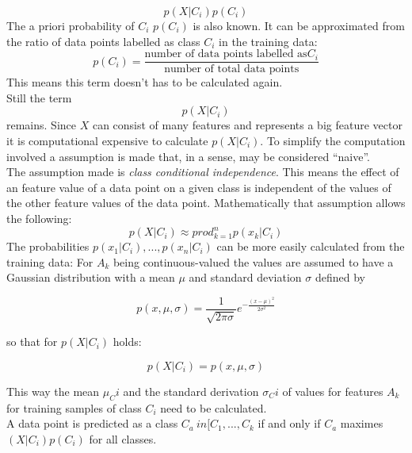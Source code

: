 \begin{equation} \label{eq:nb3}
p(X|C_i) p(C_i)
\end{equation}
The a priori probability of $C_i$  $p(C_i)$ is also known. It can be approximated from the ratio of data points labelled as class $C_i$ in the training data:
\begin{equation} \label{eq:nb4}
p(C_i)=\frac{\text{number of data points labelled as}C_i}{\text{number of total data points}}
\end{equation}
This means this term doesn't has to be calculated again.
\\
Still the term
\begin{equation} \label{eq:nb5}
p(X|C_i)
\end{equation}
remains. Since $X$ can consist of many features and represents a big feature vector it is computational expensive to calculate $p(X|C_i)$. To simplify the computation involved a assumption is made that, in a sense, may be considered ``naive''.
\\
The assumption made is \emph{class conditional independence}. This means the effect of an feature value of a data point on a given class is independent of the values of the other feature values of the data point. Mathematically that assumption allows the following:
\begin{equation} \label{eq:nb6}
p(X|C_i) \approx prod_{k=1}^{n} p(x_k|C_i)
\end{equation}
The probabilities $p(x_1|C_i), ... ,p(x_n|C_i)$ can be more easily calculated from the training data:
For $A_k$ being continuous-valued the values are assumed to have a Gaussian distribution with a mean $\mu$ and standard deviation $\sigma$ defined by

\begin{equation} \label{eq:nb7}
p(x,\mu ,\sigma) = \frac{1}{\sqrt{2\pi \sigma}}e^{-\frac{(x-\mu )^2}{2\sigma ^2}}
\end{equation}

so that for $p(X|C_i)$ holds:

\begin{equation} \label{eq:nb8}
p(X|C_i) = p(x,\mu ,\sigma)
\end{equation}

This way the mean $\mu_Ci$ and the standard derivation $\sigma_Ci$ of values for features $A_k$ for training samples of class $C_i$ need to be calculated.
\\

A data point is predicted as a class $C_a \ in [C_1,...,C_k$ if and only if $C_a$ maximes $(X|C_i) p(C_i)$  for all classes.  

